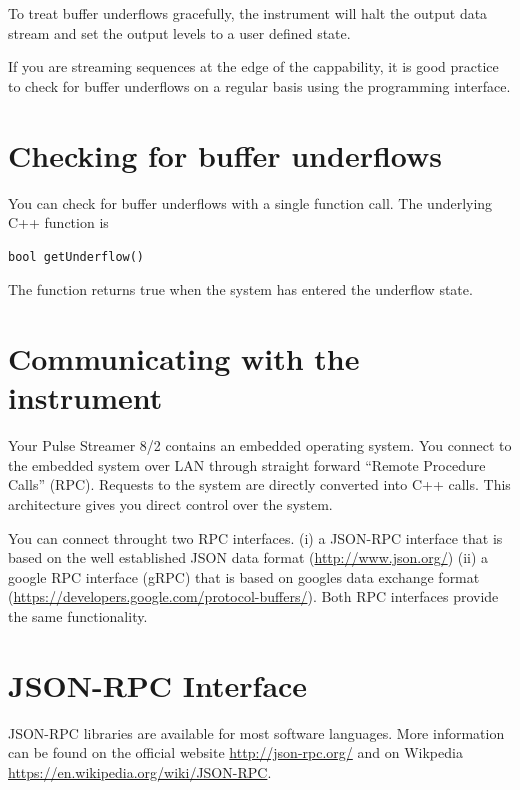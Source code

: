 \documentclass[letterpaper,10pt,english]{sphinxmanual}
\begin{document}
To treat buffer underflows gracefully, the instrument will halt the output data stream and set the output levels
to a user defined state.

If you are streaming sequences at the edge of the cappability, it is good practice to check for buffer underflows
on a regular basis using the programming interface.


\section{Checking for buffer underflows}
\label{sections/interface:checking-for-buffer-underflows}
You can check for buffer underflows with a single function call. The underlying C++ function is

\begin{Verbatim}[commandchars=\\\{\}]
bool getUnderflow()
\end{Verbatim}

The function returns true when the system has entered the underflow state.


\section{Communicating with the instrument}
\label{sections/interface:communicating-with-the-instrument}
Your Pulse Streamer 8/2 contains an embedded operating system.
You connect to the embedded system over LAN through straight forward
``Remote Procedure Calls'' (RPC). Requests to the system are
directly converted into C++ calls.
This architecture gives you direct control over the system.

You can connect throught two RPC interfaces. (i) a JSON-RPC interface that is based on
the well established JSON data format (\href{http://www.json.org/}{http://www.json.org/})
(ii) a google RPC interface (gRPC) that is based on googles data exchange format
(\href{https://developers.google.com/protocol-buffers/}{https://developers.google.com/protocol-buffers/}).
Both RPC interfaces provide the same functionality.


\section{JSON-RPC Interface}
\label{sections/interface:json-rpc-interface}
JSON-RPC libraries are available for most software languages. More information can be found
on the official website \href{http://json-rpc.org/}{http://json-rpc.org/} and on Wikpedia \href{https://en.wikipedia.org/wiki/JSON-RPC}{https://en.wikipedia.org/wiki/JSON-RPC}.
\end{document}
